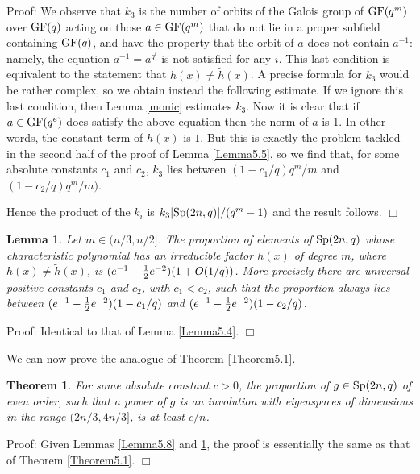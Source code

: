 \documentclass[12pt]{article}
\newtheorem{lemma}[definition]{Lemma}
\newtheorem{theorem}[definition]{Theorem}
\newenvironment{proof}{\normalsize {\sc Proof}:}{{\hfill $\Box$ \\}}
\def\GF{{\rm GF}}
\def\Sp{{\rm Sp}}
\begin{document}
\begin{proof}
We observe that $k_3$ is the number of orbits of the Galois group of
$\GF(q^m)$ over $\GF(q)$ acting on those $a \in \GF(q^m)$ that 
do not lie
in a proper subfield containing $\GF(q)$, and have the property that 
the orbit of $a$ does not
contain $a^{-1}$: namely, the equation $a^{-1}=a^{q^i}$ is not
satisfied for any $i$. This last condition is equivalent to the
statement that $h(x)\ne \tilde{h}(x)$. A precise formula for $k_3$
would be rather complex, so we obtain instead the following
estimate. If we ignore this last condition, then
Lemma \ref{monic} estimates $k_3$.
Now it is clear that if $a\in\GF(q^e)$ does satisfy the
above equation then the norm of  $a$ is 1. In other words, the
constant term of $h(x)$ is $1$. But this is exactly the problem tackled in
the second half of the proof of Lemma \ref{Lemma5.5}, so   
we find that, for some
absolute constants $c_1$ and $c_2$, $k_3$ lies between $(1-c_1 /q)q^m/m$ and
$(1-c_2 /q)q^m/m)$. 

Hence the product of the $k_i$ is
$k_3\vert\Sp(2n,q)\vert/(q^m-1)$ and the result follows. 
\end{proof}

\begin{lemma}\label{Lemma5.9} Let $m\in(n/3,n/2]$. 
The proportion of elements
of $\Sp(2n,q)$ whose characteristic polynomial has an irreducible
factor $h(x)$ of degree $m$, where $h(x)\ne \tilde{h}(x)$, is
$(e^{-1}-{1\over2}e^{-2})(1+O(1/q))$.
More precisely there are universal positive constants $c_1$ and $c_2$, with 
$c_1<c_2$, such that the proportion always lies between 
$(e^{-1}-{1\over2}e^{-2})(1-c_1/q)$ and 
$(e^{-1}-{1\over2}e^{-2})(1-c_2/q)$.
\end{lemma}
\begin{proof} 
Identical to that of Lemma \ref{Lemma5.4}. 
\end{proof}

We can now prove the analogue of Theorem \ref{Theorem5.1}.

\begin{theorem}\label{Theorem5.2}  
For some absolute constant $c>0$, the proportion
of $g \in \Sp(2n,q)$ of even order, such that a power of $g$
is an involution with eigenspaces of dimensions in the range
$(2n/3,4n/3]$, is at least $c/n$.
\end{theorem}
\begin{proof} 
Given Lemmas \ref{Lemma5.8} and \ref{Lemma5.9}, the proof is 
essentially the same as that of Theorem \ref{Theorem5.1}.
\end{proof}
\end{document}
